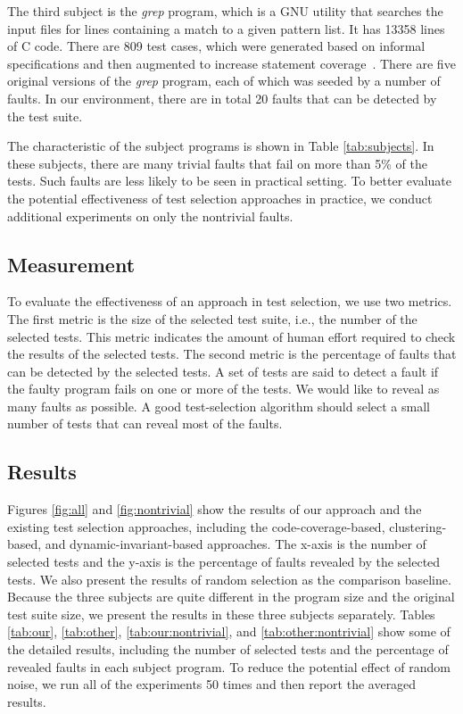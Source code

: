 \documentclass{sig-alternate}
\begin{document}
The third subject is the \emph{grep} program, which is a GNU utility
that searches the input files for lines containing a match to a
given pattern list. It has 13358 lines of C code. There are 809 test
cases, which were generated based on informal specifications and
then augmented to increase statement coverage~\cite{SIR}. There are
five original versions of the \emph{grep} program, each of which was
seeded by a number of faults. In our environment, there are in total
20 faults that can be detected by the test suite.


The characteristic of the subject programs is shown in Table
\ref{tab:subjects}. In these subjects, there are many trivial faults
that fail on more than 5\% of the tests. Such faults are less likely
to be seen in practical setting. To better evaluate the potential
effectiveness of test selection approaches in practice, we conduct
additional experiments on only the nontrivial faults.




\subsection{Measurement}



To evaluate the effectiveness of an approach in test selection, we
use two metrics. The first metric is the size of the selected test
suite, i.e., the number of the selected tests. This metric indicates
the amount of human effort required to check the results of the
selected tests. The second metric is the percentage of faults that
can be detected by the selected tests. A set of tests are said to
detect a fault if the faulty program fails on one or more of the
tests. We would like to reveal as many faults as possible. A good
test-selection algorithm should select a small number of tests that
can reveal most of the faults.



\subsection{Results}



Figures \ref{fig:all} and \ref{fig:nontrivial} show the results of
our approach and the existing test selection approaches, including
the code-coverage-based, clustering-based, and
dynamic-invariant-based approaches. The x-axis is the number of
selected tests and the y-axis is the percentage of faults revealed
by the selected tests. We also present the results of random
selection as the comparison baseline. Because the three subjects are
quite different in the program size and the original test suite
size, we present the results in these three subjects separately.
Tables \ref{tab:our}, \ref{tab:other}, \ref{tab:our:nontrivial}, and
\ref{tab:other:nontrivial} show some of the detailed results,
including the number of selected tests and the percentage of
revealed faults in each subject program. To reduce the potential
effect of random noise, we run all of the experiments 50 times and
then report the averaged results.
\end{document}
